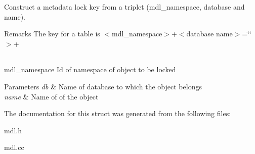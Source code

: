 Construct a metadata lock key from a triplet (mdl\+\_\+namespace, database and name).

\begin{DoxyRemark}{Remarks}
The key for a table is $<$mdl\+\_\+namespace$>$+$<$database name$>$=\char`\"{}\char`\"{}$>$+\tabulinesep=1mm
\begin{longtabu}spread 0pt [c]{*{0}{|X[-1]}|}
\hline
\end{longtabu}
mdl\+\_\+namespace Id of namespace of object to be locked 
\end{DoxyRemark}

\begin{DoxyParams}{Parameters}
{\em db} & Name of database to which the object belongs \\
\hline
{\em name} & Name of of the object \\
\hline
\end{DoxyParams}


The documentation for this struct was generated from the following files\+:\begin{DoxyCompactItemize}
\item 
mdl.\+h\item 
mdl.\+cc\end{DoxyCompactItemize}
